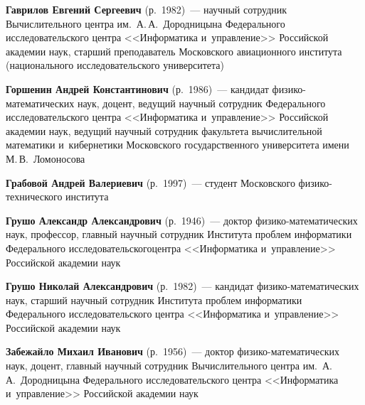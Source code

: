 \begin{multicols}{2}
\vspace*{3pt}

\noindent
\textbf{Гаврилов Евгений Сергеевич} (р.\ 1982)~--- научный сотрудник Вычислительного центра 
им.\ А.\,А.~Дородницына Федерального исследовательского центра <<Информатика 
и~управ\-ле\-ние>> Российской академии наук, старший преподаватель Московского авиационного 
института (национального исследовательского университета)

\vspace*{3pt}

\noindent
\textbf{Горшенин Андрей Константинович} (р.\ 1986)~--- кандидат 
фи\-зи\-ко-ма\-те\-ма\-ти\-че\-ских наук, доцент, ведущий научный сотрудник Федерального 
исследовательского центра <<Информатика и~управ\-ле\-ние>> Российской академии 
наук, ведущий научный сотрудник факультета вычислительной математики 
и~кибернетики Московского государственного университета имени М.\,В.~Ломоносова

\vspace*{3pt}

\noindent
\textbf{Грабовой Андрей Валериевич} (р.\ 1997)~--- студент Московского физико-технического 
института

\vspace*{3pt}



\noindent
\textbf{Грушо Александр Александрович} (р.\ 1946)~--- доктор 
фи\-зи\-ко-ма\-те\-ма\-ти\-че\-ских наук, профессор, главный научный сотрудник Института проб\-лем информатики 
Федерального исследовательского\linebreak центра <<Информатика и~управление>> Российской 
академии наук

\vspace*{3pt}

\noindent
\textbf{Грушо Николай Александрович} (р.\ 1982)~--- кандидат 
фи\-зи\-ко-ма\-те\-ма\-ти\-че\-ских наук, старший научный сотрудник Института проб\-лем информатики Федерального 
исследовательского центра <<Информатика и~управ\-ле\-ние>> Российской академии наук

\vspace*{3pt}

\noindent
\textbf{Забежайло Михаил Иванович} (р.\ 1956)~--- доктор фи\-зи\-ко-ма\-те\-ма\-ти\-че\-ских 
наук, доцент, главный научный сотрудник Вычислительного центра им.\ А.\,А.~Дородницына 
Федерального исследовательского центра <<Информатика и~управление>> Российской 
академии наук

\vspace*{3pt}


\end{multicols}
